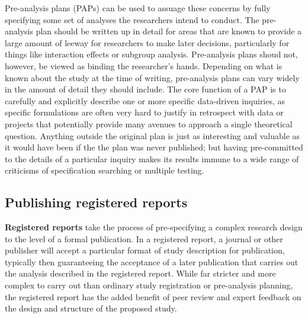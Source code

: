 Pre-analysis plans (PAPs) can be used to assuage these concerns
by fully specifying some set of analyses the researchers intend to conduct.
The pre-analysis plan should be written up in detail
for areas that are known to provide a large amount of leeway
for researchers to make later decisions,
particularly for things like interaction effects or subgroup analysis.
Pre-analysis plans shoud not, however, be viewed as binding the researcher's hands.\cite{olken2015promises}
Depending on what is known about the study at the time of writing,
pre-analysis plans can vary widely in the amount of detail they should include.
The core function of a PAP is to carefully and explicitly describe
one or more specific data-driven inquiries,
as specific formulations are often very hard to justify in retrospect
with data or projects that potentially provide many avenues to approach
a single theoretical question.
Anything outside the original plan is just as interesting and valuable
as it would have been if the the plan was never published;
but having pre-committed to the details of a particular inquiry makes its results
immune to a wide range of criticisms of specification searching or multiple testing.\cite{duflo2020praise}


\subsection{Publishing registered reports}

\textbf{Registered reports}
take the process of pre-specifying a complex research design
to the level of a formal publication.
In a registered report, a journal or other publisher
will accept a particular format of study description for publication,
typically then guaranteeing the acceptance of a later publication
that carries out the analysis described in the registered report.
While far stricter and more complex to carry out than
ordinary study registration or pre-analysis planning,
the registered report has the added benefit
of peer review and expert feedback
on the design and structure of the proposed study.

